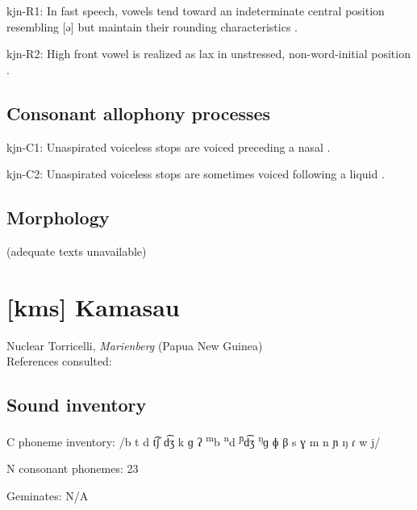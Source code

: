 {\begin{appendixdesc}
\item[kjn-R1:] In fast speech, vowels tend toward an indeterminate central position resembling [ə] but maintain their rounding characteristics \citep[41]{Sommer1969}.

\item[kjn-R2:] High front vowel is realized as lax in unstressed, non-word-initial position \citep[41]{Sommer1969}.
\end{appendixdesc}
\subsection*{Consonant allophony processes}
\begin{appendixdesc}

\item[kjn-C1:] Unaspirated voiceless stops are voiced preceding a nasal \citep[39]{Sommer1969}.

\item[kjn-C2:] Unaspirated voiceless stops are sometimes voiced following a liquid \citep[39]{Sommer1969}.
\end{appendixdesc}
\subsection*{Morphology}

(adequate texts unavailable)

\section*{[kms] Kamasau}   %
Nuclear Torricelli, \textit{Marienberg} (Papua New Guinea)\medskip\\
References consulted: \citet{SandersSanders1980}

\subsection*{Sound inventory}
\begin{appendixdesc}

\item[C phoneme inventory:] /b t d t͡ʃ d͡ʒ k ɡ ʔ \textsuperscript{m}b \textsuperscript{n}d \textsuperscript{ɲ}d͡ʒ \textsuperscript{ŋ}ɡ ɸ β s ɣ m n ɲ ŋ ɾ w j/

\item[N consonant phonemes:] 23

\item[Geminates:] N/A


\end{appendixdesc}}
